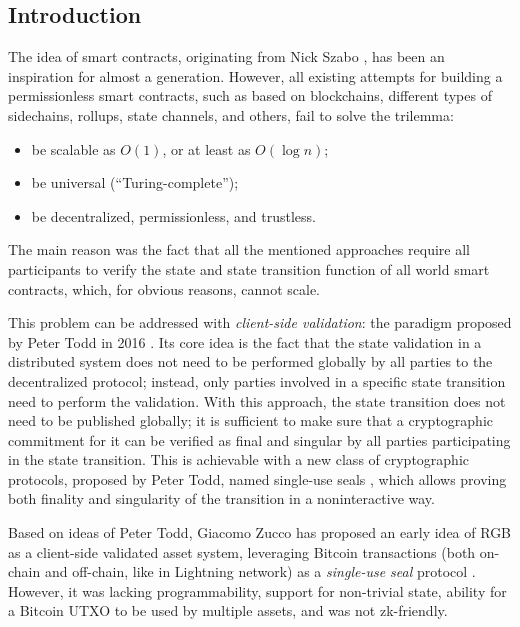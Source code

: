\documentclass[9pt,oneside]{amsart}
\begin{document}
\thispagestyle{empty}
\setlength{\columnsep}{20pt}
\begin{multicols}{2}

\section{Introduction}

The idea of smart contracts, originating from Nick Szabo \cite{Szabo},
has been an inspiration for almost a generation.
However, all existing attempts for building a permissionless smart contracts,
such as based on blockchains, different types of sidechains,
rollups, state channels, and others, fail to solve the trilemma:
\begin{itemize}
    \item be scalable as $O(1)$, or at least as $O(\log n)$;
    \item be universal (``Turing-complete'');
    \item be decentralized, permissionless, and trustless.
\end{itemize}

The main reason was the fact that all the mentioned approaches require
all participants to verify the state and state transition function of all world smart contracts,
which, for obvious reasons, cannot scale.

This problem can be addressed with
\emph{client-side validation}: the paradigm proposed by Peter Todd in 2016 \cite{CSV}.
Its core idea is the fact that the state validation in a distributed system
does not need to be performed globally by all parties to the decentralized protocol;
instead, only parties involved in a specific state transition need to perform the validation.
With this approach, the state transition does not need to be published globally;
it is sufficient to make sure that a cryptographic commitment for it
can be verified as final and singular by all parties participating in the state transition.
This is achievable with a new class of cryptographic protocols,
proposed by Peter Todd, named single-use seals \cite{SUS1, SUS2, SUS3, SUS4}, which allows
proving both finality and singularity of the transition in a noninteractive way.

Based on ideas of Peter Todd, Giacomo Zucco has proposed an early idea of RGB as
a client-side validated asset system, leveraging Bitcoin transactions
(both on-chain and off-chain, like in Lightning network)
as a \emph{single-use seal} protocol \cite{Zucco}.
However, it was lacking programmability, support for non-trivial state,
ability for a Bitcoin UTXO to be used by multiple assets,
and was not zk-friendly.


\end{multicols}
\end{document}
